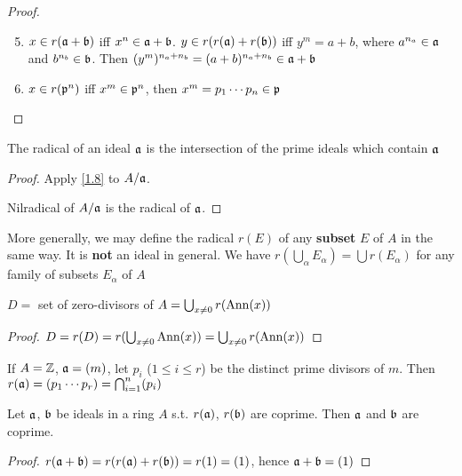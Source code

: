 \documentclass[11pt]{article}
\begin{document}
\begin{proof}
\begin{enumerate}
\setcounter{enumi}{4}
\item \(x\in r(\mathfrak{a}+\mathfrak{b})\) iff \(x^n\in\mathfrak{a}+\mathfrak{b}\). \(y\in r(r(\mathfrak{a})+r(\mathfrak{b}))\) iff \(y^m=a+b\), where \(a^{n_a}\in\mathfrak{a}\)
and \(b^{n_b}\in\mathfrak{b}\).
Then \((y^m)^{n_a+n_b}=(a+b)^{n_a+n_b}\in\mathfrak{a}+\mathfrak{b}\)
\item \(x\in r(\mathfrak{p}^n)\) iff \(x^m\in\mathfrak{p}^n\), then \(x^m=p_1\cdots p_n\in\mathfrak{p}\)
\end{enumerate}
\end{proof}

\begin{proposition}[]
\label{1.14}
The radical of an ideal \(\mathfrak{a}\) is the intersection of the prime ideals which contain \(\mathfrak{a}\)
\end{proposition}

\begin{proof}
Apply \ref{1.8} to \(A/\mathfrak{a}\).

Nilradical of \(A/\mathfrak{a}\) is the radical of \(\mathfrak{a}\).
\end{proof}

More generally, we may define the radical \(r(E)\) of any \textbf{subset} \(E\) of \(A\) in the same way.
It is \textbf{not} an ideal in general. We have \(r(\bigcup_\alpha E_\alpha)=\bigcup r(E_\alpha)\) for any family of subsets \(E_\alpha\)
of \(A\)

\begin{proposition}[]
\(D=\) set of zero-divisors of \(A=\bigcup_{x\neq 0}r(\operatorname{Ann}(x))\)
\end{proposition}

\begin{proof}
\(D=r(D)=r(\bigcup_{x\neq 0}\operatorname{Ann}(x))=\bigcup_{x\neq 0}r(\operatorname{Ann}(x))\)
\end{proof}

\begin{examplle}[]
If \(A=\mathbb{Z}\), \(\mathfrak{a}=(m)\), let \(p_i\) (\(1\le i\le r\)) be the distinct prime divisors of \(m\).
Then \(r(\mathfrak{a})=(p_1\cdots p_r)=\bigcap_{i=1}^n(p_i)\)
\end{examplle}

\begin{proposition}[]
Let \(\mathfrak{a}\), \(\mathfrak{b}\) be ideals in a ring \(A\) s.t. \(r(\mathfrak{a})\), \(r(\mathfrak{b})\) are coprime. Then \(\mathfrak{a}\)
and \(\mathfrak{b}\) are coprime.
\end{proposition}

\begin{proof}
\(r(\mathfrak{a}+\mathfrak{b})=r(r(\mathfrak{a})+r(\mathfrak{b}))=r(1)=(1)\), hence \(\mathfrak{a}+\mathfrak{b}=(1)\)
\end{proof}
\end{document}
